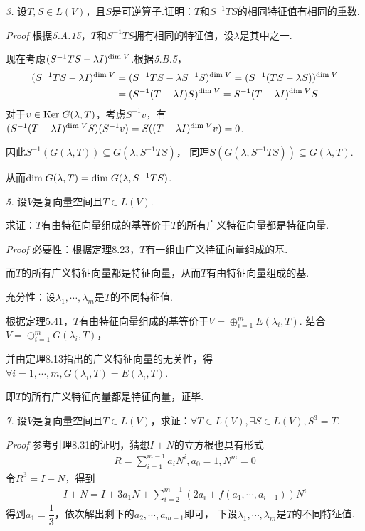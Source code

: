 \newpage

\textit{3.}
设\(T,S \in L(V)\)，且\(S\)是可逆算子.证明：\(T\)和\(S^{-1}TS\)的相同特征值有相同的重数.

\textit{Proof}
根据\textit{5.A.15}，\(T\)和\(S^{-1}TS\)拥有相同的特征值，设\(\lambda\)是其中之一.

现在考虑\((S^{-1}TS-\lambda I)^{\mathrm{dim \;} V}\).根据\textit{5.B.5}，
    \begin{align*}
        (S^{-1}TS-\lambda I)^{\mathrm{dim \;} V}&=(S^{-1}TS-\lambda S^{-1}S)^{\mathrm{dim \;} V}=(S^{-1}(TS-\lambda S))^{\mathrm{dim \;} V} \\
        &=(S^{-1}(T-\lambda I)S)^{\mathrm{dim \;} V}=S^{-1}(T-\lambda I)^{\mathrm{dim \;} V}S
    \end{align*}
对于\(v \in \mathrm{Ker \;} G(\lambda,T)\)，考虑\(S^{-1}v\)，有
\((S^{-1}(T-\lambda I)^{\mathrm{dim \;} V}S)(S^{-1}v)=S((T-\lambda I)^{\mathrm{dim \;} V}v)=0\).

因此\(S^{-1}(G(\lambda,T)) \subseteq G(\lambda,S^{-1}TS)\)，
同理\(S(G(\lambda,S^{-1}TS)) \subseteq G(\lambda,T)\).

从而\(\mathrm{dim \;} G(\lambda,T)=\mathrm{dim \;} G(\lambda,S^{-1}TS)\).

\hspace*{\fill}

\textit{5.}
设\(V\)是复向量空间且\(T \in L(V)\).

求证：\(T\)有由特征向量组成的基等价于\(T\)的所有广义特征向量都是特征向量.

\textit{Proof}
必要性：根据定理8.23，\(T\)有一组由广义特征向量组成的基.

而\(T\)的所有广义特征向量都是特征向量，从而\(T\)有由特征向量组成的基.

充分性：设\(\lambda_1,\cdots,\lambda_m\)是\(T\)的不同特征值.

根据定理5.41，\(T\)有由特征向量组成的基等价于\(V=\oplus_{i=1}^m E(\lambda_i,T)\).
结合\(V=\oplus_{i=1}^m G(\lambda_i,T)\)，

并由定理8.13指出的广义特征向量的无关性，得\(\forall i=1,\cdots,m,G(\lambda_i,T)=E(\lambda_i,T)\).

即\(T\)的所有广义特征向量都是特征向量，证毕.

\hspace*{\fill}

\textit{7.}
设\(V\)是复向量空间且\(T \in L(V)\)，求证：\(\forall T \in L(V),\exists S \in L(V),S^3=T\).

\textit{Proof}
参考引理8.31的证明，猜想\(I+N\)的立方根也具有形式
    \begin{align*}
        R=\sum_{i=1}^{m-1} a_iN^i,a_0=1,N^m=0
    \end{align*}
令\(R^3=I+N\)，得到
    \begin{align*}
        I+N=I+3a_1N+\sum_{i=2}^{m-1} (2a_i+f(a_1,\cdots,a_{i-1}))N^i
    \end{align*}
得到\(a_1=\dfrac{1}{3}\)，依次解出剩下的\(a_2,\cdots,a_{m-1}\)即可，
下设\(\lambda_1,\cdots,\lambda_m\)是\(T\)的不同特征值.

